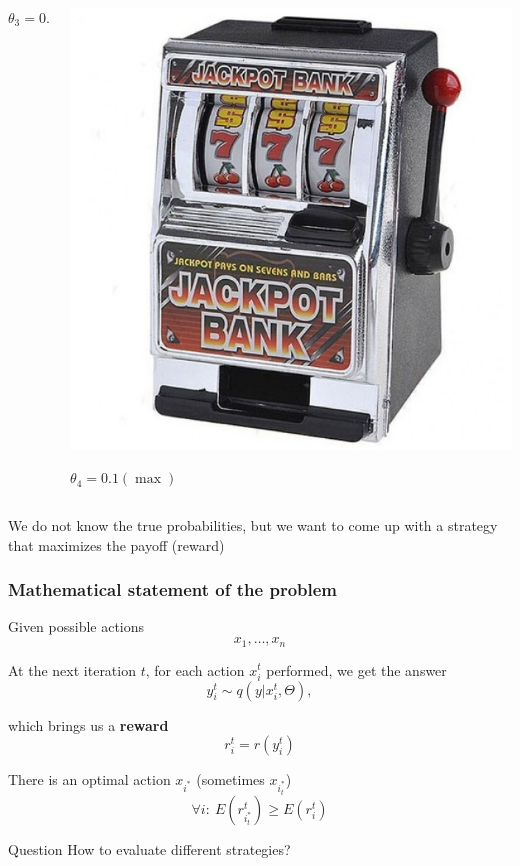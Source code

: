 \documentclass[fullscreen=true, bookmarks=true, hyperref={pdfencoding=unicode}]{beamer}
\begin{document}
\begin{frame}
\begin{columns}
\begin{column}{.25\paperwidth}
\begin{center}
        $\theta_3 = 0.05$
        \end{center}
      \end{column}
      \begin{column}{.25\paperwidth}
        \begin{center}
          \includegraphics[keepaspectratio,
                           width=.2\paperwidth]{data-kopilkabandit.jpg}

           $\theta_4 = 0.1 (\max)$
        \end{center}
      \end{column}
  \end{columns}

  \vspace{1cm}
  We do not know the true probabilities, but we want to come up with a strategy that maximizes the payoff (reward)
\end{frame}


\begin{frame}
  \frametitle{Mathematical statement of the problem}

  Given possible actions $$x_1, \dots, x_n$$

  \pause
  At the next iteration $t$, for each action $x^t_i$ performed, we get the answer $$ y^t_i \sim q(y|x^t_i, \Theta),$$

  \pause
  which brings us a {\bf reward} $$r_i^t = r(y^t_i)$$

  \pause
  There is an optimal action $x_{i^*}$ (sometimes $x_{i^*_t}$) $$\forall i:\ E(r_{i^*_t}^t) \geq E(r^t_i) $$

  \pause
  \begin{block}{Question}
    How to evaluate different strategies?
  \end{block}
\end{frame}
\end{document}
